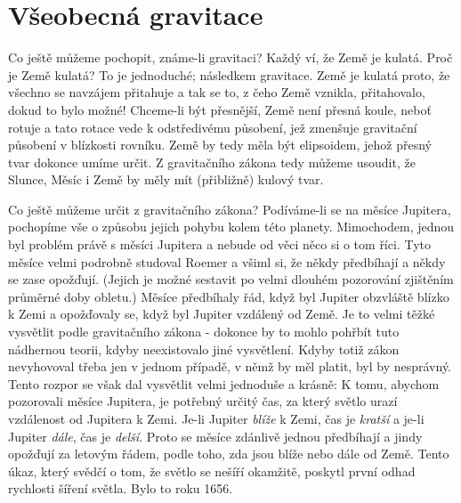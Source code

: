 {  \section{Všeobecná gravitace}
    Co ještě můžeme pochopit, známe-li gravitaci? Každý ví, že Země je kulatá. Proč je Země kulatá? 
    To je jednoduché; následkem gravitace. Země je kulatá proto, že všechno se navzájem přitahuje a 
    tak se to, z čeho Země vznikla, přitahovalo, dokud to bylo možné! Chceme-li být přesnější, Země 
    není přesná koule, neboť rotuje a tato rotace vede k odstředivému působení, jež zmenšuje 
    gravitační působení v blízkosti rovníku. Země by tedy měla být elipsoidem, jehož přesný tvar 
    dokonce umíme určit. Z gravitačního zákona tedy můžeme usoudit, že Slunce, Měsíc i Země by měly 
    mít (přibližně) kulový tvar.
    
    Co ještě můžeme určit z gravitačního zákona? Podíváme-li se na měsíce Jupitera, pochopíme vše o 
    způsobu jejich pohybu kolem této planety. Mimochodem, jednou byl problém právě s měsíci 
    Jupitera a nebude od věci něco si o tom říci. Tyto měsíce velmi podrobně studoval Roemer a 
    všiml si, že někdy předbíhají  a někdy se zase opožďují. (Jejich  
    je možné sestavit po velmi dlouhém pozorování zjištěním průměrné doby obletu.) Měsíce 
    předbíhaly řád, když byl Jupiter obzvláště blízko k Zemi a opožďovaly se, když byl Jupiter 
    vzdálený od Země. Je to velmi těžké vysvětlit podle gravitačního zákona - dokonce by to mohlo 
    pohřbít tuto nádhernou teorii, kdyby neexistovalo jiné vysvětlení. Kdyby totiž zákon 
    nevyhovoval třeba jen v jednom případě, v němž by měl platit, byl by nesprávný. Tento rozpor se 
    však dal vysvětlit velmi jednoduše a krásně: K tomu, abychom pozorovali měsíce Jupitera, je 
    potřebný určitý čas, za který světlo urazí vzdálenost od Jupitera k Zemi. Je-li Jupiter 
    \emph{blíže} k Zemi, čas je \emph{kratší} a je-li Jupiter \emph{dále}, čas je \emph{delší}. 
    Proto se měsíce zdánlivě jednou předbíhají a jindy opožďují za letovým řádem, podle toho, zda 
    jsou blíže nebo dále od Země. Tento úkaz, který svědčí o tom, že světlo se nešíří okamžitě, 
    poskytl první odhad rychlosti šíření světla. Bylo to roku 1656.
    
}
